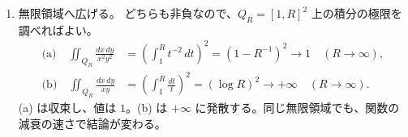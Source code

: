 \documentclass[a4paper,10pt,pdflatex,ja=standard,jafont=ipaex-type1,
  magstyle=real,scale=1]{bxjsarticle}
\newcommand{\examplelabel}[1]{{\sffamily\mdseries\color{ink}#1}}
\newenvironment{problems}
  {\begin{enumerate}[leftmargin=2em,itemsep=6pt,topsep=3pt,parsep=0pt,
    font=\color{accent}]}
  {\end{enumerate}}
\begin{document}
\begin{problems}
\item \examplelabel{無限領域へ広げる。}
どちらも非負なので、$Q_R=[1,R]^2$ 上の積分の極限を調べればよい。
$$
 \begin{aligned}
 \text{(a)}\quad\iint_{Q_R}\frac{dx\,dy}{x^2y^2}
 &=\left(\int_1^Rt^{-2}\,dt\right)^2=(1-R^{-1})^2
 \longrightarrow1\quad(R\to\infty),\\
 \text{(b)}\quad\iint_{Q_R}\frac{dx\,dy}{xy}
 &=\left(\int_1^R\frac{dt}{t}\right)^2=(\log R)^2
 \longrightarrow+\infty\quad(R\to\infty).
 \end{aligned}
$$
(a) は収束し、値は $1$。(b) は $+\infty$ に発散する。同じ無限領域でも、関数の減衰の速さで結論が変わる。
\end{problems}
\end{document}
